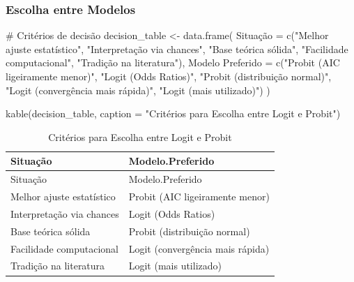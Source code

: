 \documentclass[
  letterpaper,
  DIV=11,
  numbers=noendperiod]{scrartcl}
\newenvironment{Shaded}{\begin{snugshade}}{\end{snugshade}}
\newcommand{\AttributeTok}[1]{\textcolor[rgb]{0.40,0.45,0.13}{#1}}
\newcommand{\CommentTok}[1]{\textcolor[rgb]{0.37,0.37,0.37}{#1}}
\newcommand{\FunctionTok}[1]{\textcolor[rgb]{0.28,0.35,0.67}{#1}}
\newcommand{\NormalTok}[1]{\textcolor[rgb]{0.00,0.23,0.31}{#1}}
\newcommand{\OtherTok}[1]{\textcolor[rgb]{0.00,0.23,0.31}{#1}}
\newcommand{\StringTok}[1]{\textcolor[rgb]{0.13,0.47,0.30}{#1}}
\begin{document}
\subsubsection{Escolha entre Modelos}\label{escolha-entre-modelos}

\begin{Shaded}
\begin{Highlighting}[]
\CommentTok{\# Critérios de decisão}
\NormalTok{decision\_table }\OtherTok{\textless{}{-}} \FunctionTok{data.frame}\NormalTok{(}
\NormalTok{  Situação }\OtherTok{=} \FunctionTok{c}\NormalTok{(}\StringTok{"Melhor ajuste estatístico"}\NormalTok{, }\StringTok{"Interpretação via chances"}\NormalTok{, }
               \StringTok{"Base teórica sólida"}\NormalTok{, }\StringTok{"Facilidade computacional"}\NormalTok{, }
               \StringTok{"Tradição na literatura"}\NormalTok{),}
  \StringTok{\textasciigrave{}}\AttributeTok{Modelo Preferido}\StringTok{\textasciigrave{}} \OtherTok{=} \FunctionTok{c}\NormalTok{(}\StringTok{"Probit (AIC ligeiramente menor)"}\NormalTok{, }\StringTok{"Logit (Odds Ratios)"}\NormalTok{, }
                         \StringTok{"Probit (distribuição normal)"}\NormalTok{, }\StringTok{"Logit (convergência mais rápida)"}\NormalTok{, }
                         \StringTok{"Logit (mais utilizado)"}\NormalTok{)}
\NormalTok{)}

\FunctionTok{kable}\NormalTok{(decision\_table, }\AttributeTok{caption =} \StringTok{"Critérios para Escolha entre Logit e Probit"}\NormalTok{)}
\end{Highlighting}
\end{Shaded}

\begin{longtable}[]{@{}ll@{}}
\caption{Critérios para Escolha entre Logit e Probit}\tabularnewline
\toprule\noalign{}
Situação & Modelo.Preferido \\
\midrule\noalign{}
\endfirsthead
\toprule\noalign{}
Situação & Modelo.Preferido \\
\midrule\noalign{}
\endhead
\bottomrule\noalign{}
\endlastfoot
Melhor ajuste estatístico & Probit (AIC ligeiramente menor) \\
Interpretação via chances & Logit (Odds Ratios) \\
Base teórica sólida & Probit (distribuição normal) \\
Facilidade computacional & Logit (convergência mais rápida) \\
Tradição na literatura & Logit (mais utilizado) \\
\end{longtable}
\end{document}
